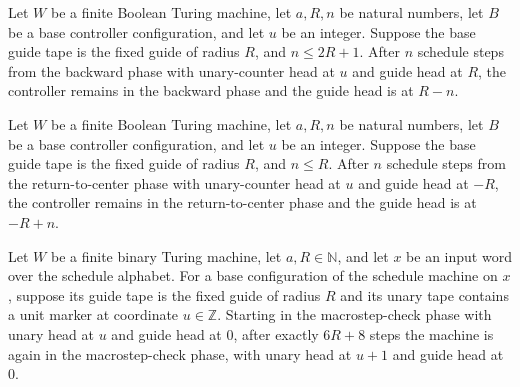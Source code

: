 \begin{lemma}
\label{Complexity.macroCfg_backward_run}
\leanok
{}
Let $W$ be a finite Boolean Turing machine, let $a,R,n$ be natural numbers, let $B$ be a
base controller configuration, and let $u$ be an integer. Suppose the base guide tape is
the fixed guide of radius $R$, and $n\le 2R+1$. After $n$ schedule steps from the
backward phase with unary-counter head at $u$ and guide head at $R$, the controller
remains in the backward phase and the guide head is at $R-n$.
\end{lemma}

\begin{lemma}
\label{Complexity.macroCfg_center_run}
\leanok
{}
Let $W$ be a finite Boolean Turing machine, let $a,R,n$ be natural numbers, let $B$ be a
base controller configuration, and let $u$ be an integer. Suppose the base guide tape is
the fixed guide of radius $R$, and $n\le R$. After $n$ schedule steps from the
return-to-center phase with unary-counter head at $u$ and guide head at $-R$, the
controller remains in the return-to-center phase and the guide head is at $-R+n$.
\end{lemma}

\begin{lemma}
\label{Complexity.macroCfg_cycle}
\leanok
{}
Let $W$ be a finite binary Turing machine, let $a,R\in\mathbb{N}$, and let $x$ be an
input word over the schedule alphabet. For a base configuration of the schedule machine
on $x$, suppose its guide tape is the fixed guide of radius $R$ and its unary tape
contains a unit marker at coordinate $u\in\mathbb{Z}$. Starting in the macrostep-check
phase with unary head at $u$ and guide head at $0$, after exactly $6R+8$ steps the
machine is again in the macrostep-check phase, with unary head at $u+1$ and guide head
at $0$.
\end{lemma}

